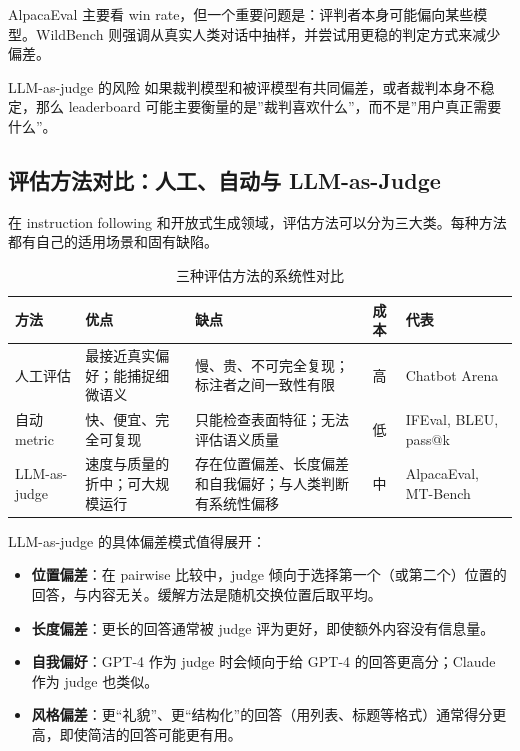 \documentclass[a4paper]{article}
\begin{document}
AlpacaEval 主要看 win rate，但一个重要问题是：评判者本身可能偏向某些模型。WildBench 则强调从真实人类对话中抽样，并尝试用更稳的判定方式来减少偏差。

\begin{warningbox}{LLM-as-judge 的风险}
如果裁判模型和被评模型有共同偏差，或者裁判本身不稳定，那么 leaderboard 可能主要衡量的是”裁判喜欢什么”，而不是”用户真正需要什么”。
\end{warningbox}

\subsection{评估方法对比：人工、自动与 LLM-as-Judge}

在 instruction following 和开放式生成领域，评估方法可以分为三大类。每种方法都有自己的适用场景和固有缺陷。

\begin{table}[H]
\centering
\small
\begin{tabular}{p{2.4cm}p{3.0cm}p{3.0cm}p{2.4cm}p{2.4cm}}
\toprule
\textbf{方法} & \textbf{优点} & \textbf{缺点} & \textbf{成本} & \textbf{代表} \\
\midrule
人工评估 & 最接近真实偏好；能捕捉细微语义 & 慢、贵、不可完全复现；标注者之间一致性有限 & 高 & Chatbot Arena \\
\midrule
自动 metric & 快、便宜、完全可复现 & 只能检查表面特征；无法评估语义质量 & 低 & IFEval, BLEU, pass@k \\
\midrule
LLM-as-judge & 速度与质量的折中；可大规模运行 & 存在位置偏差、长度偏差和自我偏好；与人类判断有系统性偏移 & 中 & AlpacaEval, MT-Bench \\
\bottomrule
\end{tabular}
\caption{三种评估方法的系统性对比}
\end{table}

LLM-as-judge 的具体偏差模式值得展开：
\begin{itemize}
    \item \textbf{位置偏差}：在 pairwise 比较中，judge 倾向于选择第一个（或第二个）位置的回答，与内容无关。缓解方法是随机交换位置后取平均。
    \item \textbf{长度偏差}：更长的回答通常被 judge 评为更好，即使额外内容没有信息量。
    \item \textbf{自我偏好}：GPT-4 作为 judge 时会倾向于给 GPT-4 的回答更高分；Claude 作为 judge 也类似。
    \item \textbf{风格偏差}：更``礼貌''、更``结构化''的回答（用列表、标题等格式）通常得分更高，即使简洁的回答可能更有用。
\end{itemize}
\end{document}
